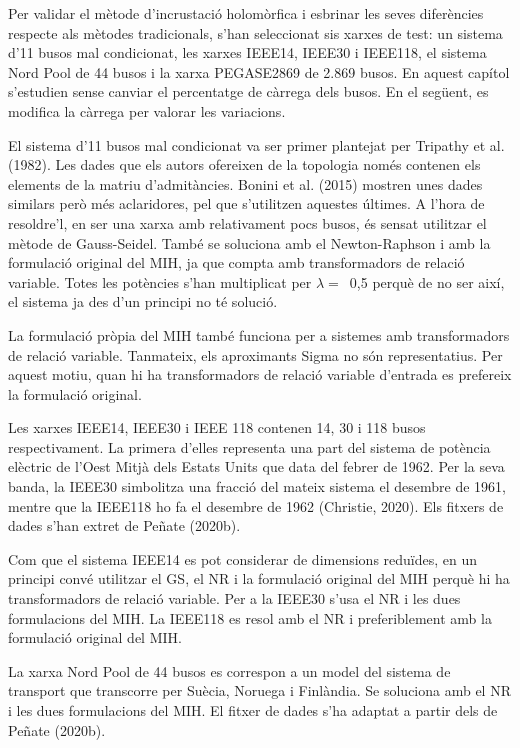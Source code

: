 
Per validar el mètode d'incrustació holomòrfica i esbrinar les seves diferències respecte als mètodes tradicionals, s'han seleccionat sis xarxes de test: un sistema d'11 busos mal condicionat, les xarxes IEEE14, IEEE30 i IEEE118, el sistema Nord Pool de 44 busos i la xarxa PEGASE2869 de 2.869 busos. En aquest capítol s'estudien sense canviar el percentatge de càrrega dels busos. En el següent, es modifica la càrrega per valorar les variacions.

El sistema d'11 busos mal condicionat va ser primer plantejat per Tripathy et al. (1982). Les dades que els autors ofereixen de la topologia només contenen els elements de la matriu d'admitàncies. Bonini et al. (2015) mostren unes dades similars però més aclaridores, pel que s'utilitzen aquestes últimes. A l'hora de resoldre'l, en ser una xarxa amb relativament pocs busos, és sensat utilitzar el mètode de Gauss-Seidel. També se soluciona amb el Newton-Raphson i amb la formulació original del MIH, ja que compta amb transformadors de relació variable. Totes les potències s'han multiplicat per $\lambda=$\ 0,5 perquè de no ser així, el sistema ja des d'un principi no té solució.

La formulació pròpia del MIH també funciona per a sistemes amb transformadors de relació variable. Tanmateix, els aproximants Sigma no són representatius. Per aquest motiu, quan hi ha transformadors de relació variable d'entrada es prefereix la formulació original.

Les xarxes IEEE14, IEEE30 i IEEE 118 contenen 14, 30 i 118 busos respectivament. La primera d'elles representa una part del sistema de potència elèctric de l'Oest Mitjà dels Estats Units que data del febrer de 1962. Per la seva banda, la IEEE30 simbolitza una fracció del mateix sistema el desembre de 1961, mentre que la IEEE118 ho fa el desembre de 1962 (Christie, 2020). Els fitxers de dades s'han extret de Peñate (2020b).

Com que el sistema IEEE14 es pot considerar de dimensions reduïdes, en un principi convé utilitzar el GS, el NR i la formulació original del MIH perquè hi ha transformadors de relació variable. Per a la IEEE30 s'usa el NR i les dues formulacions del MIH. La IEEE118 es resol amb el NR i preferiblement amb la formulació original del MIH.

La xarxa Nord Pool de 44 busos es correspon a un model del sistema de transport que transcorre per Suècia, Noruega i Finlàndia. Se soluciona amb el NR i les dues formulacions del MIH. El fitxer de dades s'ha adaptat a partir dels de Peñate (2020b).

